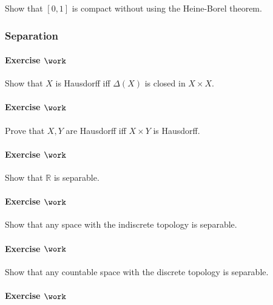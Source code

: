 Show that \([0, 1]\) is compact without using the Heine-Borel theorem.

\hypertarget{separation}{%
\subsubsection{Separation}\label{separation}}

\hypertarget{exercise-work-31}{%
\paragraph{\texorpdfstring{Exercise
\(\work\)}{Exercise \textbackslash work}}\label{exercise-work-31}}

Show that \(X\) is Hausdorff iff \(\Delta(X)\) is closed in
\(X\times X\).

\hypertarget{exercise-work-32}{%
\paragraph{\texorpdfstring{Exercise
\(\work\)}{Exercise \textbackslash work}}\label{exercise-work-32}}

Prove that \(X, Y\) are Hausdorff iff \(X\times Y\) is Hausdorff.

\hypertarget{exercise-work-33}{%
\paragraph{\texorpdfstring{Exercise
\(\work\)}{Exercise \textbackslash work}}\label{exercise-work-33}}

Show that \({\mathbb{R}}\) is separable.

\hypertarget{exercise-work-34}{%
\paragraph{\texorpdfstring{Exercise
\(\work\)}{Exercise \textbackslash work}}\label{exercise-work-34}}

Show that any space with the indiscrete topology is separable.

\hypertarget{exercise-work-35}{%
\paragraph{\texorpdfstring{Exercise
\(\work\)}{Exercise \textbackslash work}}\label{exercise-work-35}}

Show that any countable space with the discrete topology is separable.

\hypertarget{exercise-work-36}{%
\paragraph{\texorpdfstring{Exercise
\(\work\)}{Exercise \textbackslash work}}\label{exercise-work-36}}

